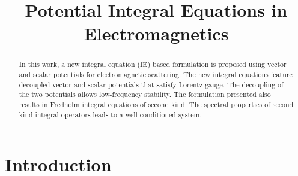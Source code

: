 \documentclass[conference]{IEEEtran}
\begin{document}
%
\title{ Potential Integral Equations in Electromagnetics}


\author{
\and
{}
}




\maketitle

\begin{abstract}
In this work, a new integral equation (IE) based formulation is proposed using vector and scalar potentials for electromagnetic scattering. The new integral equations feature decoupled vector and scalar potentials that satisfy Lorentz gauge. The decoupling  of the two potentials allows low-frequency stability. The formulation presented also results in Fredholm integral equations of second kind. The spectral properties of second kind integral operators leads to a well-conditioned system. 
\end{abstract}


\IEEEpeerreviewmaketitle

\section{Introduction}
\end{document}
